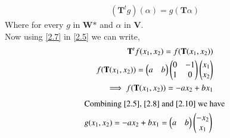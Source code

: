\documentclass[journal,12pt,twocolumn]{IEEEtran}
\begin{document}
\begin{align}
(\textbf{T}^{t}g)(\alpha)  = g (\textbf{T}\alpha) \label{2.7}
\end{align}
Where for every $g$ in $\textbf{W*}$ and $\alpha$ in \textbf{V}.\\

Now using \eqref{2.7} in \eqref{2.5} we can write,
\begin{align}
 \textbf{T}^{t} f(x_1, x_2) = f(\textbf{T}(x_1, x_2)) \label{2.8}\\
f(\textbf{T}(x_1, x_2)) = \begin{pmatrix}a & b\end{pmatrix}\begin{pmatrix}0 & -1 \\ 1 & 0\end{pmatrix}\begin{pmatrix}x_1 \\x_2\end{pmatrix}\\
\implies f(\textbf{T}(x_1, x_2)) = -ax_2 + bx_1 \label{2.10}
\end{align}
\begin{align}
\intertext{Combining \eqref{2.5}, \eqref{2.8} and \eqref{2.10} we have}
  g(x_1, x_2) = -ax_2 + bx_1 = \begin{pmatrix}a & b\end{pmatrix}\begin{pmatrix}-x_2 \\ x_1\end{pmatrix}
\end{align}
\end{document}
